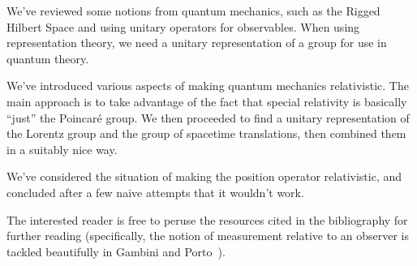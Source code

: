 
We've reviewed some notions from quantum mechanics, such as the
Rigged Hilbert Space and using unitary operators for
observables. When using representation theory, we need a unitary
representation of a group for use in quantum theory.

We've introduced various aspects of making quantum mechanics
relativistic. The main approach is to take advantage of the fact
that special relativity is basically ``just'' the Poincar\'e
group. We then proceeded to find a unitary representation of the
Lorentz group and the group of spacetime translations, then
combined them in a suitably nice way.

We've considered the situation of making the position operator
relativistic, and concluded after a few naive attempts that it
wouldn't work. 

The interested reader is free to peruse the resources cited in
the bibliography for further reading (specifically, the notion of
measurement relative to an observer is tackled beautifully in
Gambini and Porto~\cite{Gambini:2001pq}).
